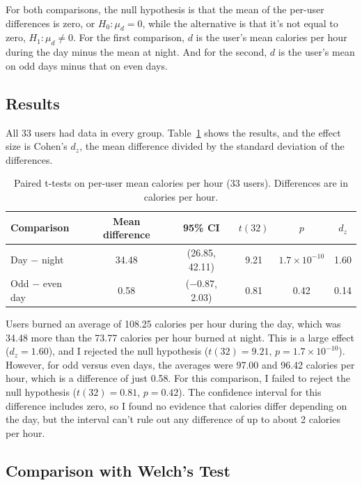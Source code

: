 \documentclass[11pt]{article}
\begin{document}
For both comparisons, the null hypothesis is that the mean of the per-user differences is zero, or $H_0: \mu_d = 0$, while the alternative is that it's not equal to zero, $H_1: \mu_d \neq 0$.
For the first comparison, $d$ is the user's mean calories per hour during the day minus the mean at night.
And for the second, $d$ is the user's mean on odd days minus that on even days.

\subsection{Results}

All 33 users had data in every group.
Table~\ref{tab:ttests} shows the results, and the effect size is Cohen's $d_z$, the mean difference divided by the standard deviation of the differences.

\begin{table}[H]
	\centering
	\begin{tabular}{lccccc}
		\toprule
		Comparison       & Mean difference & 95\% CI         & $t(32)$ & $p$                   & $d_z$ \\
		\midrule
		Day $-$ night    & 34.48           & (26.85, 42.11)  & 9.21    & $1.7 \times 10^{-10}$ & 1.60  \\
		Odd $-$ even day & 0.58            & ($-0.87$, 2.03) & 0.81    & 0.42                  & 0.14  \\
		\bottomrule
	\end{tabular}
	\caption{Paired t-tests on per-user mean calories per hour (33 users). Differences are in calories per hour.}
	\label{tab:ttests}
\end{table}

Users burned an average of 108.25 calories per hour during the day, which was 34.48 more than the 73.77 calories per hour burned at night.
This is a large effect ($d_z = 1.60$), and I rejected the null hypothesis ($t(32) = 9.21$, $p = 1.7 \times 10^{-10}$).
However, for odd versus even days, the averages were 97.00 and 96.42 calories per hour, which is a difference of just 0.58.
For this comparison, I failed to reject the null hypothesis ($t(32) = 0.81$, $p = 0.42$).
The confidence interval for this difference includes zero, so I found no evidence that calories differ depending on the day, but the interval can't rule out any difference of up to about 2 calories per hour.

\subsection{Comparison with Welch's Test}
\end{document}
